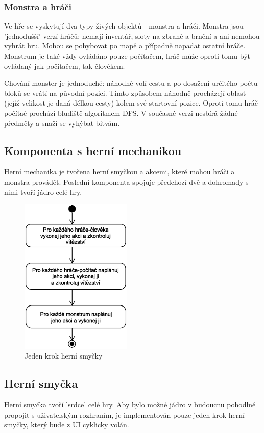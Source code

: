 \documentclass[11pt,a4paper]{scrartcl}
\begin{document}
	\subsubsection{Monstra a hráči}
	Ve hře se vyskytují dva typy živých objektů - monstra a hráči. Monstra jsou 'jednodušší' verzí hráčů: nemají inventář, sloty na zbraně a brnění a ani nemohou vyhrát hru. Mohou se pohybovat po mapě a případně napadat ostatní hráče. Monstrum je také vždy ovládáno pouze počítačem, hráč může oproti tomu být ovládaný jak počítačem, tak člověkem.
	
	Chování monster je jednoduché: náhodně volí cestu a po dosažení určitého počtu bloků se vrátí na původní pozici. Tímto způsobem náhodně procházejí oblast (jejíž velikost je daná délkou cesty) kolem své startovní pozice. Oproti tomu hráč-počítač prochází bludiště algoritmem DFS. V současné verzi nesbírá žádné předměty a snaží se vyhýbat bitvám.
	
	\subsection{Komponenta s herní mechanikou}
	Herní mechanika je tvořena herní smyčkou a akcemi, které mohou hráči a monstra provádět. Poslední komponenta spojuje předchozí dvě a dohromady s nimi tvoří jádro celé hry.
	
			\begin{figure}[H]
				\centering
				\includegraphics[height=75mm]{game-loop-simple}
				\caption{Jeden krok herní smyčky}
				\label{fig:game-loop}
			\end{figure}
	
	\subsection{Herní smyčka}
	Herní smyčka tvoří 'srdce' celé hry. Aby bylo možné jádro v budoucnu pohodlně propojit s uživatelským rozhraním, je implementován pouze jeden krok herní smyčky, který bude z UI cyklicky volán. 
	
\end{document}
